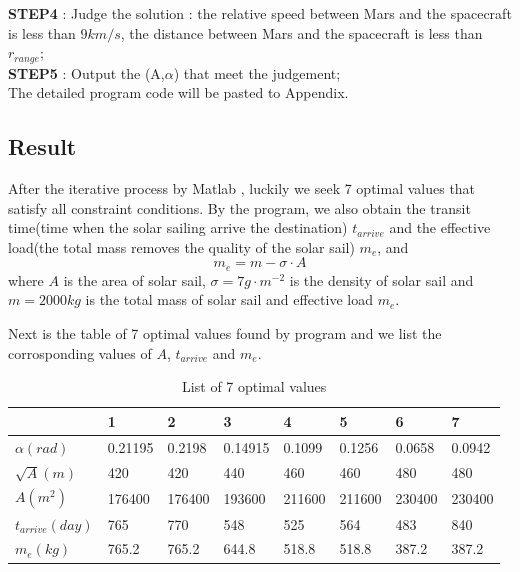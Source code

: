 \documentclass[../Paper.tex]{subfiles}
\begin{document}
\textbf{STEP4} : Judge the solution : the relative speed between Mars and the spacecraft is less 
than $9km/s$, the distance between Mars and the spacecraft is less than $r_{range}$;\\[1mm]

\textbf{STEP5} : Output the (A,$\alpha$) that meet the judgement;\\[1mm]

The detailed program code will be pasted to Appendix.

\subsection{Result}

After the iterative process by Matlab , luckily we seek 7 optimal values that satisfy all constraint conditions.
By the program, we also obtain the transit time(time when the solar sailing arrive the destination) 
$ t_{arrive} $ and the effective load(the total mass removes the quality of the solar sail) $ m_{e} $, and
$$ m_{e} = m - \sigma \cdot A $$
where $A$ is the area of solar sail, $ \sigma = 7g\cdot m^{-2} $ is the density of solar sail and 
$ m = 2000kg $ is the total mass of solar sail and effective load $m_{e}$. 

Next is the table of 7 optimal values found by program and we list the corrosponding values of $A$, $t_{arrive}$ and $m_{e}$.

\renewcommand\arraystretch{2} %
\begin{table}[H]
\centering
\scriptsize %
\begin{tabular}{ p{1.5cm}<{\centering}|p{1.5cm}<{\centering}|p{1.5cm}<{\centering}|p{1.5cm}<{\centering}|
				 p{1.5cm}<{\centering}|p{1.5cm}<{\centering}|p{1.5cm}<{\centering}|p{1.5cm}<{\centering}  }
\hline
  &  1  &  2  &  3  &  4  &  5   &  6  &  7 \\
\hline
$ \alpha(rad) $ & 0.21195 & 0.2198 & 0.14915 & 0.1099 & 0.1256 & 0.0658 & 0.0942 \\
\hline
$ \sqrt{A}(m) $ & 420 & 420 & 440 & 460 & 460 & 480 & 480 \\
\hline
$ A(m^2) $ & 176400 & 176400 & 193600 & 211600 & 211600 & 230400 & 230400 \\
\hline
$ t_{arrive}(day)  $ & 765 & 770 & 548 & 525 & 564 & 483 & 840 \\
\hline
$ m_{e}(kg) $ & 765.2 & 765.2 & 644.8 & 518.8 & 518.8 & 387.2 & 387.2 \\
\hline
\end{tabular}
\caption{List of 7 optimal values}
\label{Tableofoptimalvalues}
\end{table}  
\end{document}
